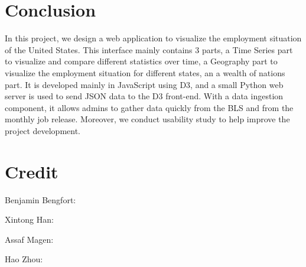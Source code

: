 \documentclass{sigchi}
\begin{document}
\section{Conclusion}
In this project, we design a web application to visualize the employment situation of the United States. This interface mainly contains 3 parts, a Time Series part to visualize and compare different statistics over time, a Geography part to visualize the employment situation for different states, an a wealth of nations part. It is developed mainly in JavaScript using D3, and a small Python web server is used to send JSON data to the D3 front-end. With a data ingestion component, it allows admins to gather data quickly from the BLS and from the monthly job release. Moreover, we conduct usability study to help improve the project development.

\balance{}




\newpage{}

\section{Credit}

Benjamin Bengfort:

Xintong Han:

Assaf Magen:

Hao Zhou:
\end{document}

